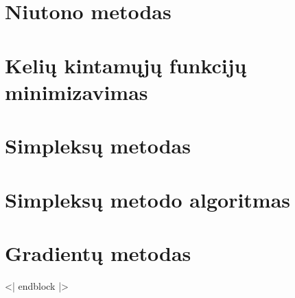 \section{Niutono metodas}
\cite[217]{textbook}
\section{Kelių kintamųjų funkcijų minimizavimas}
\cite[220-221]{textbook}
\section{Simpleksų metodas}
\cite[222-224]{textbook}
\section{Simpleksų metodo algoritmas}
\cite[225]{textbook}
\section{Gradientų metodas}

<| endblock |>
